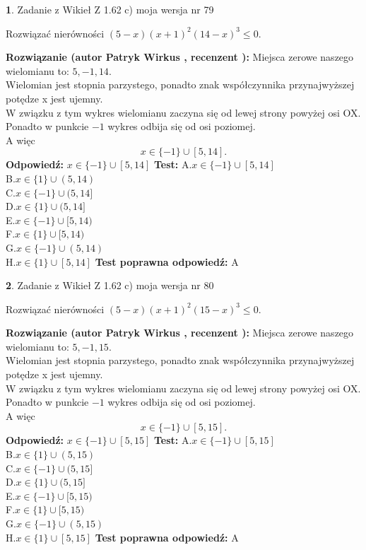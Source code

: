 \documentclass[12pt, a4paper]{article}
\theoremstyle{definition} %
\newtheorem{zad}{}
\newcommand{\zadStart}[1]{\begin{zad}#1\newline}
\newcommand{\zadStop}{\end{zad}}
\newcommand{\rozwStart}[2]{\noindent \textbf{Rozwiązanie (autor #1 , recenzent #2): }\newline}
\newcommand{\rozwStop}{\newline}
\newcommand{\odpStart}{\noindent \textbf{Odpowiedź:}\newline}
\newcommand{\odpStop}{\newline}
\newcommand{\testStart}{\noindent \textbf{Test:}\newline}
\newcommand{\testStop}{\newline}
\newcommand{\kluczStart}{\noindent \textbf{Test poprawna odpowiedź:}\newline}
\newcommand{\kluczStop}{\newline}
\begin{document}
\zadStart{Zadanie z Wikieł Z 1.62 c) moja wersja nr 79}

Rozwiązać nierówności $(5-x)(x+1)^{2}(14-x)^{3}\le0$.
\zadStop
\rozwStart{Patryk Wirkus}{}
Miejsca zerowe naszego wielomianu to: $5, -1, 14$.\\
Wielomian jest stopnia parzystego, ponadto znak współczynnika przy\linebreak najwyższej potędze x jest ujemny.\\ W związku z tym wykres wielomianu zaczyna się od lewej strony powyżej osi OX.\\
Ponadto w punkcie $-1$ wykres odbija się od osi poziomej.\\
A więc $$x \in \{-1\} \cup [5,14].$$
\rozwStop
\odpStart
$x \in \{-1\} \cup [5,14]$
\odpStop
\testStart
A.$x \in \{-1\} \cup [5,14]$\\
B.$x \in \{1\} \cup (5,14)$\\
C.$x \in \{-1\} \cup (5,14]$\\
D.$x \in \{1\} \cup (5,14]$\\
E.$x \in \{-1\} \cup [5,14)$\\
F.$x \in \{1\} \cup [5,14)$\\
G.$x \in \{-1\} \cup (5,14)$\\
H.$x \in \{1\} \cup [5,14]$
\testStop
\kluczStart
A
\kluczStop



\zadStart{Zadanie z Wikieł Z 1.62 c) moja wersja nr 80}

Rozwiązać nierówności $(5-x)(x+1)^{2}(15-x)^{3}\le0$.
\zadStop
\rozwStart{Patryk Wirkus}{}
Miejsca zerowe naszego wielomianu to: $5, -1, 15$.\\
Wielomian jest stopnia parzystego, ponadto znak współczynnika przy\linebreak najwyższej potędze x jest ujemny.\\ W związku z tym wykres wielomianu zaczyna się od lewej strony powyżej osi OX.\\
Ponadto w punkcie $-1$ wykres odbija się od osi poziomej.\\
A więc $$x \in \{-1\} \cup [5,15].$$
\rozwStop
\odpStart
$x \in \{-1\} \cup [5,15]$
\odpStop
\testStart
A.$x \in \{-1\} \cup [5,15]$\\
B.$x \in \{1\} \cup (5,15)$\\
C.$x \in \{-1\} \cup (5,15]$\\
D.$x \in \{1\} \cup (5,15]$\\
E.$x \in \{-1\} \cup [5,15)$\\
F.$x \in \{1\} \cup [5,15)$\\
G.$x \in \{-1\} \cup (5,15)$\\
H.$x \in \{1\} \cup [5,15]$
\testStop
\kluczStart
A
\kluczStop
\end{document}
